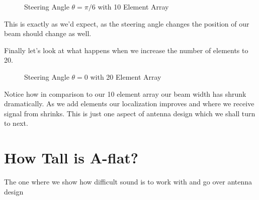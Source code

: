 \documentclass[10pt,a4paper]{article}
\begin{document}
\begin{figure}[!htb]
\caption{\label{fig:my-label} Steering Angle $\theta=\pi/6$ with 10 Element Array}
\end{figure}

This is exactly as we'd expect, as the steering angle changes the position of our beam should change as well. 

Finally let's look at what happens when we increase the number of elements to 20.

\begin{figure}[!htb]
\caption{\label{fig:my-label} Steering Angle $\theta=0$ with 20 Element Array}
\end{figure}

Notice how in comparison to our 10 element array our beam width has shrunk dramatically. As we add elements our localization improves and where we receive signal from shrinks. This is just one aspect of antenna design which we shall turn to next.

\newpage


\section{How Tall is A-flat?}
The one where we show how difficult sound is to work with and go over antenna design
\end{document}
